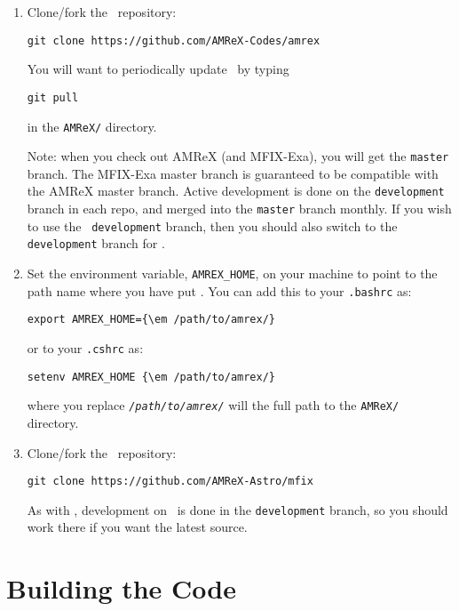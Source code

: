 \begin{enumerate}

\item Clone/fork the \amrex\ repository:
\begin{verbatim}
git clone https://github.com/AMReX-Codes/amrex
\end{verbatim}

You will want to periodically update \amrex\ by typing
\begin{verbatim}
git pull
\end{verbatim}
in the {\tt AMReX/} directory.

Note: when you check out AMReX (and MFIX-Exa), you will get the {\tt master}
branch.   The MFIX-Exa master branch is guaranteed to be compatible
with the AMReX master branch.
Active development is done on the {\tt development} branch
in each repo, and merged into the {\tt master} branch monthly.
If you wish to use the \amrex\ {\tt development} branch, then you
should also switch to the {\tt development} branch for \amrex.

\item Set the environment variable, {\tt AMREX\_HOME}, on your
  machine to point to the path name where you have put \amrex.
  You can add this to your {\tt .bashrc} as:
\begin{Verbatim}[commandchars=\\\{\}]
export AMREX_HOME={\em /path/to/amrex/}
\end{Verbatim}
or to your {\tt .cshrc} as:
\begin{Verbatim}[commandchars=\\\{\}]
setenv AMREX_HOME {\em /path/to/amrex/}
\end{Verbatim}
where you replace \texttt{\em /path/to/amrex/} will the full path to the
{\tt AMReX/} directory.

\item Clone/fork the \amrex\ repository:
\begin{verbatim}
git clone https://github.com/AMReX-Astro/mfix
\end{verbatim}

As with \amrex, development on \amrex\ is done in the
{\tt development} branch, so you should work there if you want
the latest source.

\end{enumerate}

\section{Building the Code}

